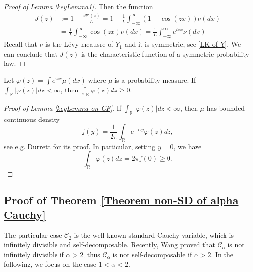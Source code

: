 \documentclass[12pt]{amsart}
\begin{document}
\begin{proof}[Proof of Lemma \ref{keyLemma1}]
Then the function 
\begin{align*}
      J(z) &:= 1 - \frac{z \Psi'(z)}{L} = 1 - \frac{1}{L}  \int_{-\infty}^{\infty} (1-\cos (zx))\nu(dx) \\
      &= \frac{1}{L}  \int_{-\infty}^{\infty} \cos (zx)\nu(dx) = \frac{1}{L}  \int_{-\infty}^{\infty} e^{izx}\nu(dx)
\end{align*}
Recall that $\nu$ is the L\'evy meausre of $Y_1$ and it is symmetric, see \eqref{LK of Y}. We can conclude that $J(z)$ is the characteristic function of a symmetric probability law. 
\end{proof}



\begin{lemma}\label{keyLemma on CF}
    Let $\varphi(z) = \int e^{izx}\mu(dx)$ where $\mu$ is a probability measure. If $\int_\mathbb{R}|\varphi(z)|dz < \infty$, then $  \int_\mathbb{R} \varphi(z)dz \geq 0$. 
\end{lemma}

\begin{proof}[Proof of Lemma \ref{keyLemma on CF}]

 If $\int_\mathbb{R}|\varphi(z)|dz < \infty$, then $\mu$ has bounded continuous density 
$$f(y) = \frac{1}{2\pi} \int_\mathbb{R} e^{-izy} \varphi(z)dz,$$
see e.g. Durrett \cite[Theorem 3.3.14]{Dur19} for its proof. In particular, setting $y = 0$, we have 
$$  \int_\mathbb{R} \varphi(z)dz  =  2\pi f(0) \geq 0. $$
\end{proof}

\subsection{Proof of Theorem \ref{Theorem non-SD of alpha Cauchy}}  The particular case $\mathcal{C}_2$ is the well-known standard Cauchy variable, which is infinitely divisible and self-decomposable. Recently, Wang \cite{Wan26+} proved that $\mathcal{C}_\alpha$ is not infinitely divisible if $\alpha > 2$, thus $\mathcal{C}_\alpha$ is not self-decomposable if $\alpha > 2$. In the following, we focus on the case $1 < \alpha <2$. 
\end{document}
